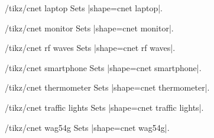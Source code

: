 \documentclass[a4paper]{ltxdoc}
\begin{document}
\begin{stylekey}{/tikz/cnet laptop}
Sets |shape={cnet laptop}|.
\begin{codeexample}[preamble={\usetikzlibrary{shapes.cnet.laptop}}]
\end{codeexample}
\end{stylekey}

\begin{stylekey}{/tikz/cnet monitor}
Sets |shape={cnet monitor}|.
\begin{codeexample}[preamble={\usetikzlibrary{shapes.cnet.monitor}}]
\end{codeexample}
\end{stylekey}

\begin{stylekey}{/tikz/cnet rf waves}
Sets |shape={cnet rf waves}|.
\begin{codeexample}[preamble={\usetikzlibrary{shapes.cnet.rfwaves}}]
\end{codeexample}
\end{stylekey}

\begin{stylekey}{/tikz/cnet smartphone}
Sets |shape={cnet smartphone}|.
\begin{codeexample}[preamble={\usetikzlibrary{shapes.cnet.smartphone}}]
\end{codeexample}
\end{stylekey}

\begin{stylekey}{/tikz/cnet thermometer}
Sets |shape={cnet thermometer}|.
\begin{codeexample}[preamble={\usetikzlibrary{shapes.cnet.thermometer}}]
\end{codeexample}
\end{stylekey}

\begin{stylekey}{/tikz/cnet traffic lights}
Sets |shape={cnet traffic lights}|.
\begin{codeexample}[preamble={\usetikzlibrary{shapes.cnet.trafficlights}}]
\end{codeexample}
\end{stylekey}

\begin{stylekey}{/tikz/cnet wag54g}
Sets |shape={cnet wag54g}|.
\begin{codeexample}[preamble={\usetikzlibrary{shapes.cnet.wag54g}}]
\end{codeexample}
\end{stylekey}
\end{document}
